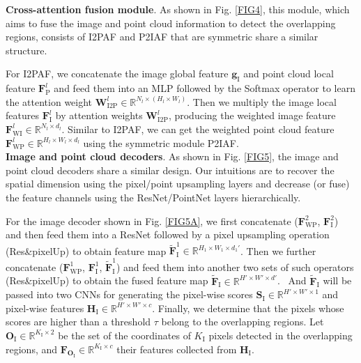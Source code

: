 \documentclass[lettersize,journal]{IEEEtran}
\begin{document}
\noindent\textbf{Cross-attention fusion module}. As shown in Fig. \ref{FIG4}, this module, which aims to fuse the image and point cloud information to detect the overlapping regions, consists of I2PAF and P2IAF that are symmetric share a similar structure. 

For I2PAF, we concatenate the image global feature $\mathbf{g}_{\text{I}}$ and point cloud local feature $\mathbf{F}_{\text{P}}^{l}$ and feed them into an MLP followed by the Softmax operator to learn the attention weight $\mathbf{W}_{\text{I2P}}^{l} \in \mathbb{R}^{N_{l} \times (H_{l} \times W_{l} )}$. Then we multiply the image local features $\mathbf{F}_{\text{I}}^{l}$ by attention weights $\mathbf{W}_{\text{I2P}}^{l}$, producing the weighted image feature $\mathbf{F}_{\text{WI}}^{l} \in \mathbb{R}^{N_{l} \times d_{l}}$. Similar to I2PAF, we can get the weighted point cloud feature $\mathbf{F}_{\text{WP}}^{l} \in \mathbb{R}^{H_{l} \times W_{l} \times d_{l}}$ using the symmetric module P2IAF.\\



\noindent\textbf{Image and point cloud decoders}. As shown in Fig. \ref{FIG5}, the image and point cloud decoders share a similar design.  Our intuitions are to recover the spatial dimension using the pixel/point upsampling layers and decrease (or fuse) the feature channels using the ResNet/PointNet layers hierarchically.



For the image decoder shown in Fig. \ref{FIG5A}, we first concatenate ($\mathbf{F}_{\text{WP}}^{2}$, $\mathbf{F}_{\text{I}}^{2}$) and then feed them into a ResNet followed by a pixel upsampling operation (Res\&pixelUp) to obtain  feature map $\widetilde{\mathbf{F}}_{\text{I}}^{1}\in \mathbb{R}^{H_{1} \times W_{1} \times d_{1} '}$. Then we further concatenate ($\mathbf{F}_{\text{WP}}^{1}$, $\mathbf{F}_{\text{I}}^{1}$, $\widetilde{\mathbf{F}}_{\text{I}}^{1}$) and feed them into another two sets of such operators (Res\&pixelUp) to obtain the fused feature map $\widetilde{\mathbf{F}}_{\text{I}}\in \mathbb{R}^{H'\times W' \times d '}$. \ And $\widetilde{\mathbf{F}}_{\text{I}}$ will be passed into two CNNs for generating the pixel-wise scores $\mathbf{S}_{\text{I}} \in \mathbb{R}^{H'\times W'\times 1}$ and pixel-wise features $\mathbf{H}_{\text{I}} \in \mathbb{R}^{H'\times W'\times c}$. 
Finally, we determine that the pixels whose scores are higher than a threshold $\tau$ belong to the overlapping regions. Let $\mathbf{O}_{\text{I}}\in \mathbb{R}^{K_{\text{I}}\times 2}$ be the set of the coordinates of $K_{\text{I}}$ pixels detected in the overlapping regions, and $\mathbf{F}_{\mathbf{O}_{\text{I}}}\in \mathbb{R}^{K_{\text{I}}\times c}$ their features collected from $\mathbf{H}_{\text{I}}$.  
\end{document}
